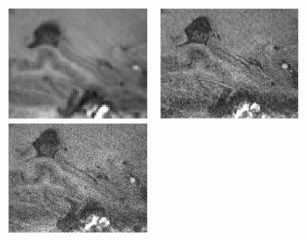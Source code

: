 \documentclass[]{article}
\begin{document}
\begin{figure}
	
	{\includegraphics[width=0.33\textwidth]{noisy5025_200_y.pdf}}~
	{\includegraphics[width=0.33\textwidth]{noisy5025_400_y.pdf}}~
	{\includegraphics[width=0.33\textwidth]{noisy5025_700_y.pdf}}~\\
	
	
	\vspace{-1em}
	

\end{figure}
\end{document}

